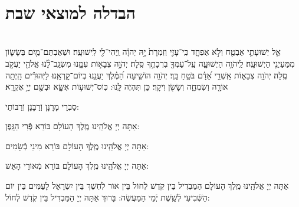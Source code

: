 \documentclass[twoside, openany, parskip=half, 11pt]{book}
\begin{document}
\aleinu

\ledavid

\mournerskaddish

\vfill


 \\


\section[הבדלה]{ הבדלה למוצאי שבת } \label{havdala}

\\
אֵ֧ל יְשׁוּעָתִ֛י אֶבְטַ֖ח וְלֹ֣א אֶפְחָ֑ד כִּֽי־עָזִּ֤י וְזִמְרָת֙ יָ֣הּ יְהוָ֔ה וַֽיְהִי־לִ֖י לִֽישׁוּעָֽה׃
וּשְׁאַבְתֶּם־מַ֖יִם בְּשָׂשׂ֑וֹן מִמַּעַיְנֵ֖י הַיְשׁוּעָֽה׃
לַֽיהֹוָ֥ה הַיְשׁוּעָ֑ה עַֽל־עַמְּךָ֖ בִרְכָתֶ֣ךָ סֶּֽלָה׃ 
יְהֹוָ֣ה צְבָא֣וֹת עִמָּ֑נוּ מִשְׂגָּֽב־לָ֨נוּ אֱלֹהֵ֖י יַעֲקֹ֣ב סֶֽלָה׃
יְהֹוָ֥ה צְבָא֑וֹת אַֽשְׁרֵ֥י אָ֝דָ֗ם בֹּטֵ֥חַ בָּֽךְ׃
יְהֹוָ֥ה הוֹשִׁ֑יעָה הַ֝מֶּ֗לֶךְ יַעֲנֵ֥נוּ בְיוֹם־קׇרְאֵֽנוּ׃
לַיְּהוּדִ֕ים הָֽיְתָ֥ה אוֹרָ֖ה וְשִׂמְחָ֑ה וְשָׂשֹׂ֖ן וִיקָֽר׃ כֵּן תִּהְיֶה לָּֽנוּ: כּֽוֹס־יְשׁוּע֥וֹת אֶשָּׂ֑א וּבְשֵׁ֖ם יְיָ֣ אֶקְרָֽא׃

\begin{scriptsize}
	סַבְרֵי מָרָנָן וְֿרַבָּנָן וְֿרַבּוֹתַי: \\
\end{scriptsize}
אַתָּה יְיָ אֱלֹהֵֽינוּ מֶֽלֶךְ הָעוֹלָם בּוֹרֵא פְּֿרִי הַגָּֽפֶן:

אַתָּה יְיָ אֱלֹהֵֽינוּ מֶֽלֶךְ הָעוֹלָם בּוֹרֵא מִינֵי בְֿשָׂמִים:

אַתָּה יְיָ אֱלֹהֵֽינוּ מֶֽלֶךְ הָעוֹלָם בּוֹרֵא מְֿאוֹרֵי הָאֵשׁ:

אַתָּה יְיָ אֱלֹהֵֽינוּ מֶֽלֶךְ הָעוֹלָם הַמַּבְדִיל בֵּין קֹֽדֶשׁ לְֿחוֹל בֵּין אוֹר לְֿחֽשֶׁךְ בֵּין יִשְׂרָאֵל לָעַמִּים בֵּין יוֹם הַשְּֿׁבִיעִי לְֿשֵֽׁשֶׁת יְֿמֵי הַמַּעֲשֶׂה: בָּרוּךְ אַתָּה יְיָ הַמַּבְדִּיל בֵּין קֹֽדֶשׁ לְֿחוֹל:
\clearpage

\vspace{-1.3\baselineskip}
\end{document}

